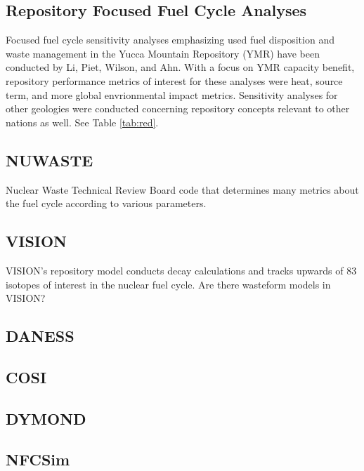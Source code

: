 \subsection{Repository Focused Fuel Cycle Analyses}

Focused fuel cycle sensitivity analyses emphasizing used fuel disposition and 
waste management in the Yucca Mountain Repository (YMR) have been 
conducted by Li, Piet, Wilson, and Ahn. With a focus on YMR capacity 
benefit, repository performance metrics of interest for these analyses 
were heat, source term, and more global envrionmental impact metrics.  
Sensitivity analyses for other geologies were conducted concerning 
repository concepts relevant to other nations as well. See Table 
\ref{tab:red}.




\subsection{NUWASTE} Nuclear Waste Technical Review Board code that 
determines many metrics about the fuel cycle according to various 
parameters. \cite{abkowitz_nuclear_2010}

\subsection{VISION}
VISION's repository model conducts decay calculations and tracks 
upwards of 83 isotopes of interest in the nuclear fuel cycle.  
\cite{yacout_visionverifiable_2006} Are there wasteform models in VISION?

\subsection{DANESS}

\subsection{COSI}

\subsection{DYMOND}

\subsection{NFCSim}

